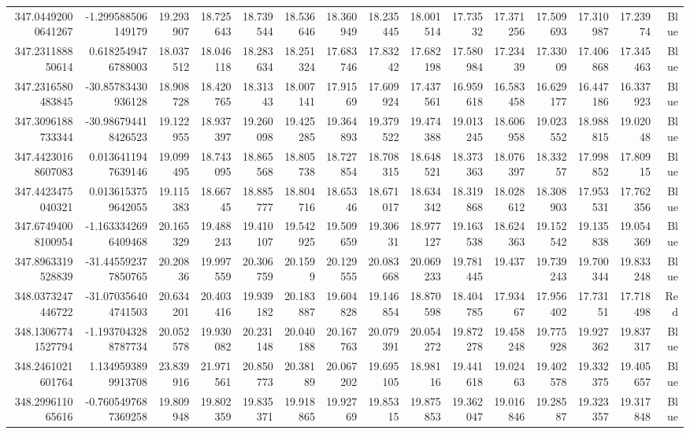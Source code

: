 \begin{center}
\begin{longtable}{rrrrrrrrrrrrrrr}
347.04492000641267 & -1.299588506149179 & 19.293907 & 18.725643 & 18.739544 & 18.536646 & 18.360949 & 18.235445 & 18.001514 & 17.73532 & 17.371256 & 17.509693 & 17.310987 & 17.23974 & Blue \\
347.231188850614 & 0.6182549476788003 & 18.037512 & 18.046118 & 18.283634 & 18.251324 & 17.683746 & 17.83242 & 17.682198 & 17.580984 & 17.23439 & 17.33009 & 17.406868 & 17.345463 & Blue \\
347.2316580483845 & -30.85783430936128 & 18.908728 & 18.420765 & 18.31343 & 18.007141 & 17.91569 & 17.609924 & 17.437561 & 16.959618 & 16.583458 & 16.629177 & 16.447186 & 16.337923 & Blue \\
347.3096188733344 & -30.986794418426523 & 19.122955 & 18.937397 & 19.260098 & 19.425285 & 19.364893 & 19.379522 & 19.474388 & 19.013245 & 18.606958 & 19.023552 & 18.988815 & 19.02048 & Blue \\
347.44230168607083 & 0.0136411947639146 & 19.099495 & 18.743095 & 18.865568 & 18.805738 & 18.727854 & 18.708315 & 18.648521 & 18.373363 & 18.076397 & 18.33257 & 17.998852 & 17.80915 & Blue \\
347.4423475040321 & 0.0136153759642055 & 19.115383 & 18.66745 & 18.885777 & 18.804716 & 18.65346 & 18.671017 & 18.634342 & 18.319868 & 18.028612 & 18.308903 & 17.953531 & 17.762356 & Blue \\
347.67494008100954 & -1.1633342696409468 & 20.165329 & 19.488243 & 19.410107 & 19.542925 & 19.509659 & 19.30631 & 18.977127 & 19.163538 & 18.624363 & 19.152542 & 19.135838 & 19.054369 & Blue \\
347.8963319528839 & -31.445592377850765 & 20.20836 & 19.997559 & 20.306759 & 20.1599 & 20.129555 & 20.083668 & 20.069233 & 19.781445 & 19.437 & 19.739243 & 19.700344 & 19.833248 & Blue \\
348.0373247446722 & -31.070356404741503 & 20.634201 & 20.403416 & 19.939182 & 20.183887 & 19.604828 & 19.146854 & 18.870598 & 18.404785 & 17.93467 & 17.956402 & 17.73151 & 17.718498 & Red \\
348.13067741527794 & -1.1937043288787734 & 20.052578 & 19.930082 & 20.231148 & 20.040188 & 20.167763 & 20.079391 & 20.054272 & 19.872278 & 19.458248 & 19.775928 & 19.927362 & 19.837317 & Blue \\
348.2461021601764 & 1.1349593899913708 & 23.839916 & 21.971561 & 20.850773 & 20.38189 & 20.067202 & 19.695105 & 18.98116 & 19.441618 & 19.02463 & 19.402578 & 19.332375 & 19.405657 & Blue \\
348.299611065616 & -0.7605497687369258 & 19.809948 & 19.802359 & 19.835371 & 19.918865 & 19.92769 & 19.85315 & 19.875853 & 19.362047 & 19.016846 & 19.28587 & 19.323357 & 19.317848 & Blue \\

\end{longtable}
\end{center}
